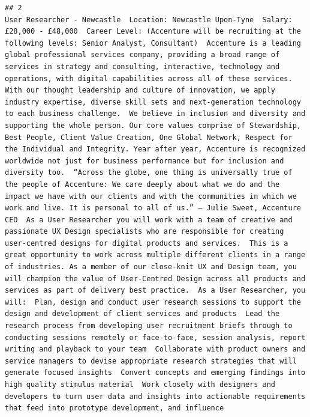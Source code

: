 \documentclass[
]{article}
\begin{document}
\begin{verbatim}
## 2                                                                                                                                                                                                                                                                                                                                                                                                                                                                                                                                                                                                                                                                                                                                                                                                                                                                                                                                                                                                                                    User Researcher - Newcastle  Location: Newcastle Upon-Tyne  Salary: £28,000 - £48,000  Career Level: (Accenture will be recruiting at the following levels: Senior Analyst, Consultant)  Accenture is a leading global professional services company, providing a broad range of services in strategy and consulting, interactive, technology and operations, with digital capabilities across all of these services. With our thought leadership and culture of innovation, we apply industry expertise, diverse skill sets and next-generation technology to each business challenge.  We believe in inclusion and diversity and supporting the whole person. Our core values comprise of Stewardship, Best People, Client Value Creation, One Global Network, Respect for the Individual and Integrity. Year after year, Accenture is recognized worldwide not just for business performance but for inclusion and diversity too.  “Across the globe, one thing is universally true of the people of Accenture: We care deeply about what we do and the impact we have with our clients and with the communities in which we work and live. It is personal to all of us.” – Julie Sweet, Accenture CEO  As a User Researcher you will work with a team of creative and passionate UX Design specialists who are responsible for creating user-centred designs for digital products and services.  This is a great opportunity to work across multiple different clients in a range of industries. As a member of our close-knit UX and Design team, you will champion the value of User-Centred Design across all products and services as part of delivery best practice.  As a User Researcher, you will:  Plan, design and conduct user research sessions to support the design and development of client services and products  Lead the research process from developing user recruitment briefs through to conducting sessions remotely or face-to-face, session analysis, report writing and playback to your team  Collaborate with product owners and service managers to devise appropriate research strategies that will generate focused insights  Convert concepts and emerging findings into high quality stimulus material  Work closely with designers and developers to turn user data and insights into actionable requirements that feed into prototype development, and influence 
\end{verbatim}
\end{document}
